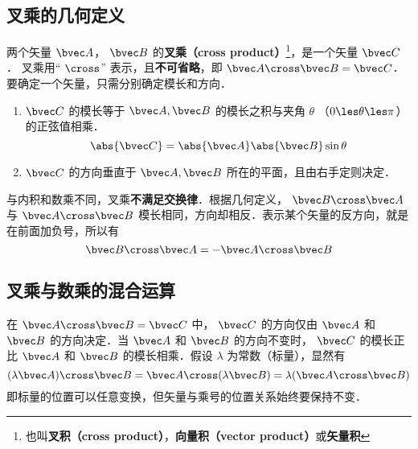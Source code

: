 

\subsection{叉乘的几何定义}
两个矢量 $\bvec A$，  $\bvec B$ 的\textbf{叉乘（cross product）}\footnote{也叫\textbf{叉积（cross product）}，\textbf{向量积（vector product）}或\textbf{矢量积}}，是一个矢量 $\bvec C$．  叉乘用“ $\cross$” 表示，且\textbf{不可省略}，即 $ \bvec A \cross \bvec B = \bvec C$．要确定一个矢量，只需分别确定模长和方向．

\begin{enumerate}
\item $\bvec C$ 的模长等于 $\bvec A, \bvec B$ 的模长之积与夹角 $\theta$ （$0 \les \theta \les \pi$）的正弦值相乘．
\begin{equation}\label{Cross_eq1}
\abs{\bvec C}  = \abs{\bvec A} \abs{\bvec B} \sin\theta 
\end{equation}
\item $\bvec C$ 的方向垂直于 $\bvec A, \bvec B$ 所在的平面，且由右手定则决定．
\end{enumerate}

与内积和数乘不同，叉乘\textbf{不满足交换律}．根据几何定义， $\bvec B \cross \bvec A$ 与 $\bvec A \cross \bvec B$ 模长相同，方向却相反．表示某个矢量的反方向，就是在前面加负号，所以有
\begin{equation}\label{Cross_eq11}
\bvec B \cross \bvec A = -\bvec A \cross \bvec B
\end{equation}

\subsection{叉乘与数乘的混合运算}

在 $\bvec A \cross \bvec B = \bvec C$ 中， $\bvec C$ 的方向仅由 $\bvec A$ 和 $\bvec B$ 的方向决定．当 $\bvec A$ 和 $\bvec B$ 的方向不变时， $\bvec C$ 的模长正比 $\bvec A$ 和 $\bvec B$ 的模长相乘．假设 $\lambda $ 为常数（标量），显然有
\begin{equation}
(\lambda \bvec A) \cross \bvec B = \bvec A \cross (\lambda \bvec B) = \lambda (\bvec A \cross \bvec B)
\end{equation}
即标量的位置可以任意变换，但矢量与乘号的位置关系始终要保持不变．

